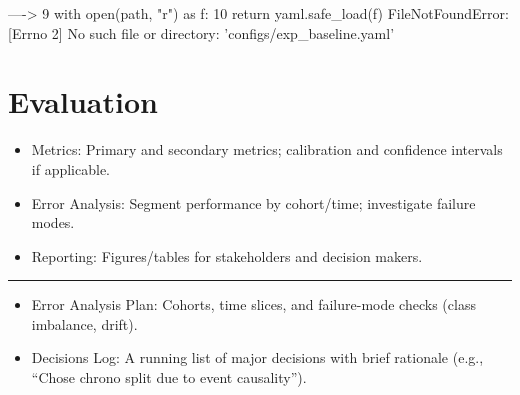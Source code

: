\documentclass[
  letterpaper,
  DIV=11,
  numbers=noendperiod]{scrartcl}
\providecommand{\tightlist}{%
  \setlength{\itemsep}{0pt}\setlength{\parskip}{0pt}}
\begin{document}
\begin{Highlighting}
\textcolor{QuartoInternalColor2}{}\textcolor{QuartoInternalColor3}{----> 9}\textcolor{QuartoInternalColor2}{     }\textcolor{QuartoInternalColor5}{with}\textcolor{QuartoInternalColor2}{ }\textcolor{QuartoInternalColor5}{open}\textcolor{QuartoInternalColor2}{}\textcolor{QuartoInternalColor2}{(}\textcolor{QuartoInternalColor2}{}\textcolor{QuartoInternalColor2}{path}\textcolor{QuartoInternalColor2}{}\textcolor{QuartoInternalColor2}{,}\textcolor{QuartoInternalColor2}{}\textcolor{QuartoInternalColor2}{ }\textcolor{QuartoInternalColor2}{}\textcolor{QuartoInternalColor8}{"}\textcolor{QuartoInternalColor2}{}\textcolor{QuartoInternalColor8}{r}\textcolor{QuartoInternalColor2}{}\textcolor{QuartoInternalColor8}{"}\textcolor{QuartoInternalColor2}{}\textcolor{QuartoInternalColor2}{)}\textcolor{QuartoInternalColor2}{ }\textcolor{QuartoInternalColor5}{as}\textcolor{QuartoInternalColor2}{ f:}
\textcolor{QuartoInternalColor2}{}\textcolor{QuartoInternalColor4}{     10}\textcolor{QuartoInternalColor2}{         }\textcolor{QuartoInternalColor5}{return}\textcolor{QuartoInternalColor2}{ yaml}\textcolor{QuartoInternalColor7}{.}\textcolor{QuartoInternalColor2}{safe\_load(f)}
\textcolor{QuartoInternalColor2}{}\textcolor{QuartoInternalColor1}{FileNotFoundError}\textcolor{QuartoInternalColor2}{: [Errno 2] No such file or directory: 'configs/exp\_baseline.yaml'}
\end{Highlighting}

\section{Evaluation}\label{evaluation}

\begin{itemize}
\tightlist
\item
  Metrics: Primary and secondary metrics; calibration and confidence
  intervals if applicable.
\item
  Error Analysis: Segment performance by cohort/time; investigate
  failure modes.
\item
  Reporting: Figures/tables for stakeholders and decision makers.
\end{itemize}

\begin{center}\rule{0.5\linewidth}{0.5pt}\end{center}

\begin{itemize}
\tightlist
\item
  Error Analysis Plan: Cohorts, time slices, and failure-mode checks
  (class imbalance, drift).
\item
  Decisions Log: A running list of major decisions with brief rationale
  (e.g., ``Chose chrono split due to event causality'').
\end{itemize}
\end{document}
